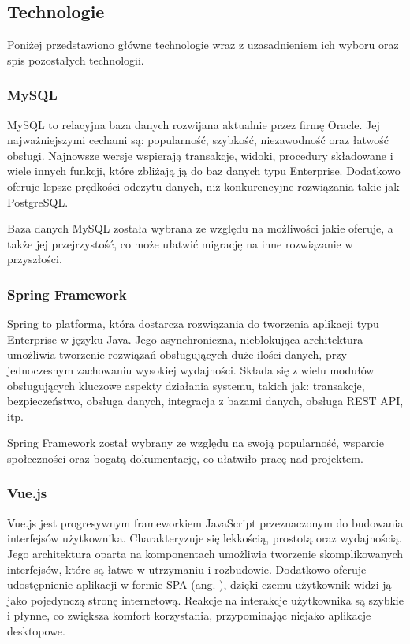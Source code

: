 \subsection{Technologie}

Poniżej przedstawiono główne technologie wraz z uzasadnieniem ich wyboru oraz spis pozostałych technologii.

\subsubsection*{MySQL}

MySQL \cite{bib:mysql} to relacyjna baza danych rozwijana aktualnie przez firmę Oracle. Jej najważniejszymi cechami są: popularność, szybkość, niezawodność oraz łatwość obsługi. Najnowsze wersje wspierają transakcje, widoki, procedury składowane i wiele innych funkcji, które zbliżają ją do baz danych typu Enterprise. Dodatkowo oferuje lepsze prędkości odczytu danych, niż konkurencyjne rozwiązania takie jak PostgreSQL.

Baza danych MySQL została wybrana ze względu na możliwości jakie oferuje, a także jej przejrzystość, co może ułatwić migrację na inne rozwiązanie w przyszłości.

\subsubsection*{Spring Framework}

Spring \cite{bib:spring} to platforma, która dostarcza rozwiązania do tworzenia aplikacji typu Enterprise w języku Java. Jego asynchroniczna, nieblokująca architektura umożliwia tworzenie rozwiązań obsługujących duże ilości danych, przy jednoczesnym zachowaniu wysokiej wydajności. Składa się z wielu modułów obsługujących kluczowe aspekty działania systemu, takich jak: transakcje, bezpieczeństwo, obsługa danych, integracja z bazami danych, obsługa REST API, itp.

Spring Framework został wybrany ze względu na swoją popularność, wsparcie społeczności oraz bogatą dokumentację, co ułatwiło pracę nad projektem.

\subsubsection*{Vue.js}

Vue.js \cite{bib:vuejs} jest progresywnym frameworkiem JavaScript przeznaczonym do budowania interfejsów użytkownika. Charakteryzuje się lekkością, prostotą oraz wydajnością. Jego architektura oparta na komponentach umożliwia tworzenie skomplikowanych interfejsów, które są łatwe w utrzymaniu i rozbudowie. Dodatkowo oferuje udostępnienie aplikacji w formie SPA (ang. ), dzięki czemu użytkownik widzi ją jako pojedynczą stronę internetową. Reakcje na interakcje użytkownika są szybkie i płynne, co zwiększa komfort korzystania, przypominając niejako aplikacje desktopowe.

